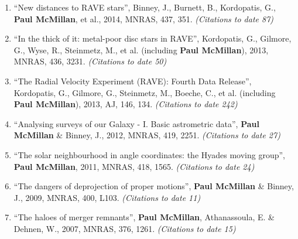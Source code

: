 \documentclass{resume}
\begin{document}
\begin{enumerate}
\item ``New distances to RAVE stars'', Binney, J., Burnett, B., Kordopatis, G., \textbf{Paul McMillan}, et al., 2014, MNRAS, 437, 351. \textit{(Citations to date 87)}

\item ``In the thick of it: metal-poor disc stars in RAVE'', Kordopatis, G., Gilmore, G., Wyse, R., Steinmetz, M., et al. (including \textbf{Paul McMillan}), 2013, MNRAS, 436, 3231. \textit{(Citations to date 50)}

\item ``The Radial Velocity Experiment (RAVE): Fourth Data Release'', Kordopatis, G., Gilmore, G., Steinmetz, M., Boeche, C., et al. (including \textbf{Paul McMillan}), 2013, AJ, 146, 134. \textit{(Citations to date 242)}

\item ``Analysing surveys of our Galaxy - I. Basic astrometric data'', \textbf{Paul McMillan} \& Binney, J., 2012, MNRAS, 419, 2251. \textit{(Citations to date 27)}

\item ``The solar neighbourhood in angle coordinates: the Hyades moving group'', \textbf{Paul McMillan}, 2011, MNRAS, 418, 1565. \textit{(Citations to date 24)}

\item ``The dangers of deprojection of proper motions'', \textbf{Paul McMillan} \& Binney, J., 2009, MNRAS, 400, L103. \textit{(Citations to date 11)}

\item ``The haloes of merger remnants'', \textbf{Paul McMillan}, Athanassoula, E. \& Dehnen, W., 2007, MNRAS, 376, 1261. \textit{(Citations to date 15)}

\end{enumerate}
\end{document}
